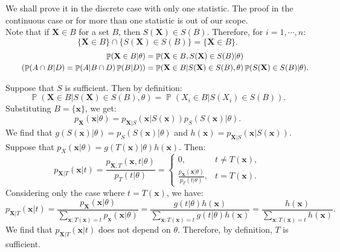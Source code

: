 \documentclass{huhtakm-template-book-v2}
\DeclareMathOperator{\prob}{\mathbb{P}}
\begin{document}
    \begin{proofing}
        We shall prove it in the discrete case with only one statistic. The proof in the continuous case or for more than one statistic is out of our scope.\\
        Note that if $\mathbf{X} \in B$ for a set $B$, then $S(\mathbf{X}) \in S(B)$. Therefore, for $i = 1, \cdots, n$:
        \begin{equation*}
            \{\mathbf{X} \in B\} \cap \{S(\mathbf{X}) \in S(B)\} = \{\mathbf{X} \in B\}.
        \end{equation*}
        \begin{align*}
            \prob(\mathbf{X} \in B | \theta) &= \prob(\mathbf{X} \in B, S(\mathbf{X}) \in S(B) | \theta)\\
            \tag{$\prob(A \cap B | D) = \prob(A | B \cap D)\prob(B | D)$}
            &= \prob(\mathbf{X} \in B | S(\mathbf{X}) \in S(B), \theta)\prob(S(\mathbf{X}) \in S(B) | \theta).
        \end{align*}
        \newpage

        Suppose that $S$ is sufficient. Then by definition:
        \begin{equation*}
            \prob(\mathbf{X} \in B | S(\mathbf{X}) \in S(B), \theta) = \prob(X_{i} \in B | S(X_{i}) \in S(B)).
        \end{equation*}
        Substituting $B = \{\mathbf{x}\}$, we get:
        \begin{equation*}
            p_{\mathbf{X}}(\mathbf{x} | \theta) = p_{\mathbf{X} | S}(\mathbf{x} | S(\mathbf{x}))p_{S}(S(\mathbf{x}) | \theta).
        \end{equation*}
        We find that $g(S(\mathbf{x}) | \theta) = p_{S}(S(\mathbf{x}) | \theta)$ and $h(\mathbf{x}) = p_{\mathbf{X} | S}(\mathbf{x} | S(\mathbf{x}))$. Suppose that $p_{X}(\mathbf{x} | \theta) = g(T(\mathbf{x}) | \theta)h(\mathbf{x})$. Then:
        \begin{equation*}
            p_{\mathbf{X} | T}(\mathbf{x} | t) = \frac{p_{\mathbf{X}, T}(\mathbf{x}, t | \theta)}{p_{T}(t | \theta)} = \begin{cases}
                0, &t \neq T(\mathbf{x}),\\
                \frac{p_{\mathbf{X}}(\mathbf{x} | \theta)}{p_{T}(t | \theta)}, &t = T(\mathbf{x}).
            \end{cases}
        \end{equation*}
        Considering only the case where $t = T(\mathbf{x})$, we have:
        \begin{equation*}
            p_{\mathbf{X} | T}(\mathbf{x} | t) = \frac{p_{\mathbf{X}}(\mathbf{x} | \theta)}{\sum_{\mathbf{x} : T(\mathbf{x}) = t}p_{\mathbf{x}}(\mathbf{x} | \theta)} = \frac{g(t | \theta)h(\mathbf{x})}{\sum_{\mathbf{x} : T(\mathbf{x}) = t}g(t | \theta)h(\mathbf{x})} = \frac{h(\mathbf{x})}{\sum_{\mathbf{x} : T(\mathbf{x}) = t}h(\mathbf{x})}.
        \end{equation*}
        We find that $p_{\mathbf{X} | T}(\mathbf{x} | t)$ does not depend on $\theta$. Therefore, by definition, $T$ is sufficient.
    \end{proofing}
\end{document}
